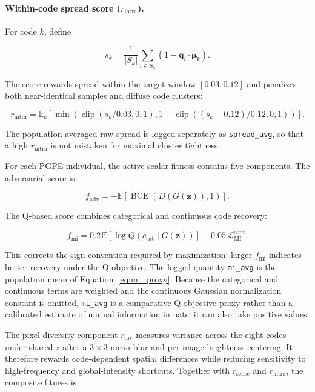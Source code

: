 \paragraph{Within-code spread score ($r_{\text{intra}}$).}
For code $k$, define

\begin{equation}
s_k = \frac{1}{|S_k|}\sum_{i\in S_k}
\left(1-\mathbf{q}_i\cdot
\widehat{\boldsymbol{\mu}}_k\right).
\end{equation}

The score rewards spread within the target window $[0.03,0.12]$ and penalizes both near-identical samples and diffuse code clusters:

\begin{equation}
r_{\text{intra}}
= \mathbb{E}_k\!\left[
\min\!\left(
\operatorname{clip}(s_k/0.03,0,1),
1-\operatorname{clip}((s_k-0.12)/0.12,0,1)
\right)
\right].
\end{equation}

The population-averaged raw spread is logged separately as \texttt{spread\_avg}, so that a high $r_{\text{intra}}$ is not mistaken for maximal cluster tightness.

For each PGPE individual, the active scalar fitness contains five components. The adversarial score is

\begin{equation}
f_{\text{adv}}
= -\mathbb{E}\!\left[
\operatorname{BCE}(D(G(\mathbf{z})),1)
\right].
\end{equation}

The Q-based score combines categorical and continuous code recovery:

\begin{equation}
f_{\text{mi}}
= 0.2\,\mathbb{E}\!\left[
\log Q(c_{\text{cat}}\mid G(\mathbf{z}))
\right]
-0.05\,\mathcal{L}_{\text{MI}}^{\text{cont}}.
\label{eq:mi_proxy}
\end{equation}

This corrects the sign convention required by maximization: larger $f_{\text{mi}}$ indicates better recovery under the Q objective. The logged quantity \texttt{mi\_avg} is the population mean of Equation~\ref{eq:mi_proxy}. Because the categorical and continuous terms are weighted and the continuous Gaussian normalization constant is omitted, \texttt{mi\_avg} is a comparative Q-objective proxy rather than a calibrated estimate of mutual information in nats; it can also take positive values.

The pixel-diversity component $r_{\text{div}}$ measures variance across the eight codes under shared $z$ after a $3\times3$ mean blur and per-image brightness centering. It therefore rewards code-dependent spatial differences while reducing sensitivity to high-frequency and global-intensity shortcuts. Together with $r_{\text{sense}}$ and $r_{\text{intra}}$, the composite fitness is

